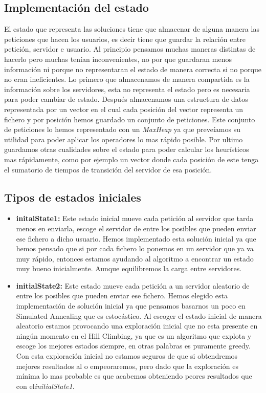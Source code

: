 \documentclass[a4paper,10pt]{report}
\begin{document}
        \subsection*{Implementación del estado}
            El estado que representa las soluciones tiene que almacenar de alguna manera las peticiones que hacen los usuarios, es decir tiene que guardar la relación entre petición, servidor e usuario. 
            Al principio pensamos muchas maneras distintas de hacerlo pero muchas tenían inconvenientes, no por que guardaran menos información ni porque no representaran el estado de manera correcta si no porque no eran ineficientes. Lo primero que almacenamos de manera compartida es la información sobre los servidores, esta no representa el estado pero es necesaria para poder cambiar de estado. Después almacenamos una estructura de datos representada por un vector en el cual cada posición del vector representa un fichero y por posición hemos guardado un conjunto de peticiones. Este conjunto de peticiones lo hemos representado con un \textit{MaxHeap} ya que preveíamos su utilidad para poder aplicar los operadores lo mas rápido posible. Por ultimo guardamos otras cualidades sobre el estado para poder calcular los heurísticos mas rápidamente, como por ejemplo un vector donde cada posición de este tenga el sumatorio de tiempos de transición del servidor de esa posición.\clearpage
    
        \subsection*{Tipos de estados iniciales}
            \begin{itemize}
                \item \textbf{initalState1:} Este estado inicial mueve cada petición al servidor que tarda menos en enviarla, escoge el servidor de entre los posibles que pueden enviar ese fichero a dicho usuario. Hemos implementado esta solución inicial ya que hemos pensado que si por cada fichero lo ponemos en un servidor que ya va muy rápido, entonces estamos ayudando al algoritmo a encontrar un estado muy bueno inicialmente. Aunque equilibremos la carga entre servidores. 
                 \item \textbf{initialState2:} Este estado mueve cada petición a un servidor aleatorio de entre los posibles que pueden enviar ese fichero. Hemos elegido esta implementación de solución inicial ya que pensamos basarnos un poco en Simulated Annealing que es estocástico. Al escoger el estado inicial de manera aleatorio estamos provocando una exploración inicial que no esta presente en ningún momento en el Hill Climbing, ya que es un algoritmo que explota y escoge los mejores estados siempre, en otras palabras es puramente greedy. Con esta exploración inicial no estamos seguros de que si obtendremos mejores resultados al o empeoraremos, pero dado que la exploración es mínima lo mas probable es que acabemos obteniendo peores resultados que con el\textit{initialState1}.
            \end{itemize}
        
\end{document}
